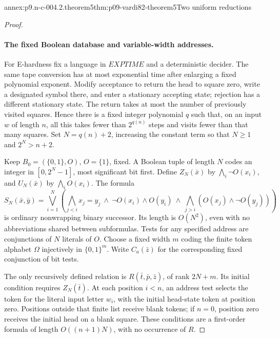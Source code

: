 \begin{annexitem}{annex:p9.n-c-004.2.theorem5}{thm:p09-vardi82-theorem5}{Two uniform reductions}
\begin{proof}
\paragraph{The fixed Boolean database and variable-width addresses.}
For E-hardness fix a language in \(EXPTIME\) and a deterministic decider.
The same tape conversion has at most exponential time after enlarging a
fixed polynomial exponent. Modify acceptance to return the head to square
zero, write a designated symbol there, and enter a stationary accepting
state; rejection has a different stationary state. The return takes at
most the number of previously visited squares. Hence there is a fixed
integer polynomial \(q\) such that, on an input \(w\) of length \(n\),
all this takes fewer than \(2^{q(n)}\) steps and visits fewer than that
many squares. Set \(N=q(n)+2\), increasing the constant term so that
\(N\geq1\) and \(2^N>n+2\).

Keep \(B_0=(\{0,1\},O)\), \(O=\{1\}\), fixed. A Boolean tuple of
length \(N\) codes an integer in \([0,2^N-1]\), most significant bit
first. Define \(Z_N(\bar x)\) by \(\bigwedge_i\neg O(x_i)\), and
\(U_N(\bar x)\) by \(\bigwedge_i O(x_i)\). The formula
\[
 S_N(\bar x,\bar y)=
 \bigvee_{i=1}^{N}\left(
    \bigwedge_{j<i}x_j=y_j\ \land\ \neg O(x_i)\land O(y_i)
    \ \land\ \bigwedge_{j>i}(O(x_j)\land\neg O(y_j))\right)
\]
is ordinary nonwrapping binary successor. Its length is \(O(N^2)\),
even with no abbreviations shared between subformulas. Tests for any
specified address are conjunctions of \(N\) literals of \(O\).
Choose a fixed width \(m\) coding the finite token alphabet \(\Omega\)
injectively in \(\{0,1\}^m\). Write \(C_a(\bar z)\) for the
corresponding fixed conjunction of bit tests.

The only recursively defined relation is
\(R(\bar t,\bar p,\bar z)\), of rank \(2N+m\). Its initial condition
requires \(Z_N(\bar t)\). At each position \(i<n\), an address test
selects the token for the literal input letter \(w_i\), with the initial
head-state token at position zero. Positions outside that finite list
receive blank tokens; if \(n=0\), position zero receives the initial
head on a blank square. These conditions are a first-order formula of
length \(O((n+1)N)\), with no occurrence of \(R\).


\end{proof}
\end{annexitem}
